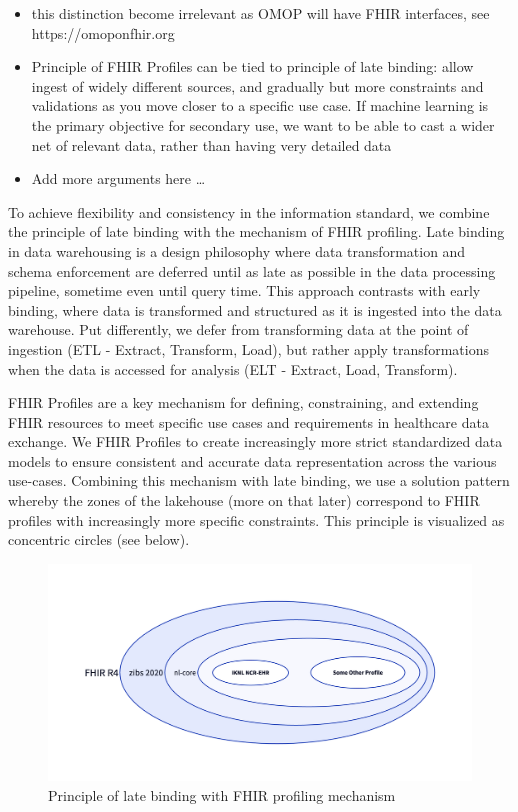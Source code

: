 \documentclass[
  authoryear]{elsarticle}
\begin{document}
\begin{itemize}
\item
  this distinction become irrelevant as OMOP will have FHIR interfaces,
  see https://omoponfhir.org
\item
  Principle of FHIR Profiles can be tied to principle of late binding:
  allow ingest of widely different sources, and gradually but more
  constraints and validations as you move closer to a specific use case.
  If machine learning is the primary objective for secondary use, we
  want to be able to cast a wider net of relevant data, rather than
  having very detailed data
\item
  Add more arguments here \ldots{}
\end{itemize}

To achieve flexibility and consistency in the information standard, we
combine the principle of late binding with the mechanism of FHIR
profiling. Late binding in data warehousing is a design philosophy where
data transformation and schema enforcement are deferred until as late as
possible in the data processing pipeline, sometime even until query
time. This approach contrasts with early binding, where data is
transformed and structured as it is ingested into the data warehouse.
Put differently, we defer from transforming data at the point of
ingestion (ETL - Extract, Transform, Load), but rather apply
transformations when the data is accessed for analysis (ELT - Extract,
Load, Transform).

FHIR Profiles are a key mechanism for defining, constraining, and
extending FHIR resources to meet specific use cases and requirements in
healthcare data exchange. We FHIR Profiles to create increasingly more
strict standardized data models to ensure consistent and accurate data
representation across the various use-cases. Combining this mechanism
with late binding, we use a solution pattern whereby the zones of the
lakehouse (more on that later) correspond to FHIR profiles with
increasingly more specific constraints. This principle is visualized as
concentric circles (see below).

\begin{figure}[H]

{\centering \includegraphics{late-binding.png}

}

\caption{Principle of late binding with FHIR profiling mechanism}

\end{figure}%
\end{document}
